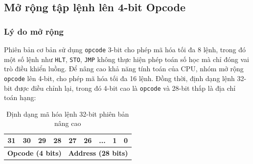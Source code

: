 \subsection{Mở rộng tập lệnh lên 4-bit Opcode}

\subsubsection{Lý do mở rộng}
Phiên bản cơ bản sử dụng \texttt{opcode} 3-bit cho phép mã hóa tối đa 8 lệnh, trong đó một số lệnh như \texttt{HLT}, \texttt{STO}, \texttt{JMP} không thực hiện phép toán số học mà chỉ đóng vai trò điều khiển luồng. Để nâng cao khả năng tính toán của CPU, nhóm mở rộng \texttt{opcode} lên 4-bit, cho phép mã hóa tối đa 16 lệnh. Đồng thời, định dạng lệnh 32-bit được điều chỉnh lại, trong đó 4-bit cao là \texttt{opcode} và 28-bit thấp là địa chỉ toán hạng:

\begin{table}[H]
\centering
\begin{tabular}{|c|c|c|c|c|c|c|c|c|}
\hline
\textbf{31} & \textbf{30} & \textbf{29} & \textbf{28} & \textbf{27} & \textbf{26} & \textbf{...} & \textbf{1} & \textbf{0} \\
\hline
\multicolumn{4}{|c|}{\textbf{Opcode (4 bits)}} & \multicolumn{5}{c|}{\textbf{Address (28 bits)}} \\
\hline
\end{tabular}
\caption{Định dạng mã hóa lệnh 32-bit phiên bản nâng cao}
\label{tab:instruction_format_levelup}
\end{table}

